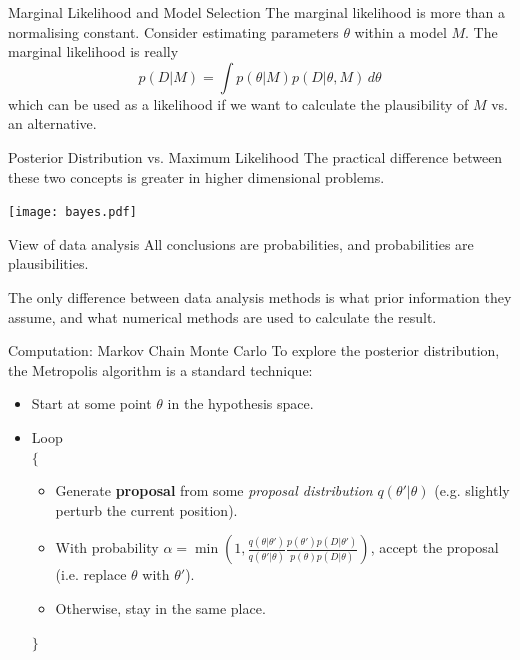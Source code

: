 \begin{frame}[t]{Marginal Likelihood and Model Selection}
The marginal likelihood is more than a normalising constant. Consider
estimating parameters $\theta$ within a model $M$. The marginal likelihood
is really
\begin{equation}
p(D|M) = \int p(\theta | M)p(D|\theta, M) \, d\theta
\end{equation}
which can
be used as a likelihood if we want to calculate the plausibility of $M$ vs.
an alternative.
\end{frame}


\begin{frame}[t]{Posterior Distribution vs. Maximum Likelihood}
The practical difference between these two concepts is greater in higher
dimensional problems.
\begin{center}
\texttt{[image: bayes.pdf]}
\end{center}
\end{frame}


\begin{frame}[t]{View of data analysis}
All conclusions are probabilities, and probabilities are plausibilities.
\vspace{20pt}

The only difference between data analysis methods is what prior information
they assume, and what numerical methods are used to calculate the result.
\end{frame}

\begin{frame}[t]{Computation: Markov Chain Monte Carlo}
To explore the posterior distribution, the Metropolis algorithm is a standard
technique:

\begin{itemize}
\item Start at some point $\theta$ in the hypothesis space.
\item Loop\\
$\{$
  \begin{itemize}
  \item Generate {\bf proposal} from some {\it proposal distribution} $q(\theta' | \theta)$
  (e.g. slightly perturb the current position).
  \item With probability $\alpha = \min\left(1, \frac{q(\theta | \theta')}{q(\theta' | \theta)}\frac{p(\theta')p(D|\theta')}{p(\theta)p(D|\theta)}\right)$, accept the proposal (i.e. replace $\theta$ with $\theta'$).
  \item Otherwise, stay in the same place.
  \end{itemize}
$\}$
\end{itemize}
\end{frame}



